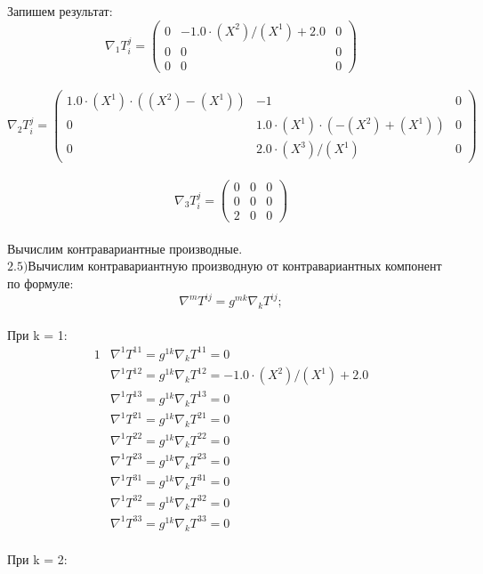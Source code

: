 \documentclass[a4paper, 12pt, oneside]{article}
\begin{document}
Запишем результат:\\
\[
\nabla_1T^j_i = \begin{pmatrix}
	0 & -1.0\cdot (X^2)/(X^1) + 2.0 & 0\\
	0 & 0 & 0\\
	0 & 0 & 0
\end{pmatrix}
\]\\
\[
\nabla_2T^j_i = \begin{pmatrix}
	1.0\cdot (X^1)\cdot ((X^2) - (X^1)) & -1 & 0\\
	0 & 1.0\cdot (X^1)\cdot (-(X^2) + (X^1)) & 0\\
	0 & 2.0\cdot (X^3)/(X^1) & 0
\end{pmatrix}
\]\\
\[
\nabla_3T^j_i = \begin{pmatrix}
	0 & 0 & 0\\
	0 & 0 & 0\\
	2 & 0 & 0
\end{pmatrix}
\]\\
Вычислим контравариантные производные.\\
$\mathrm{2.5) }$Вычислим контравариантную производную от контравариантных компонент по формуле:\\
\[
\nabla^mT^{ij} = g^{mk}\nabla_kT^{ij};
\]\\
При k = 1:\\
\begin{alignat*}{1}
  & \nabla^1T^{11} = g^{1k}\nabla_kT^{11} = 0 \\
  & \nabla^1T^{12} = g^{1k}\nabla_kT^{12} = -1.0\cdot (X^2)/(X^1) + 2.0 \\
  & \nabla^1T^{13} = g^{1k}\nabla_kT^{13} = 0 \\
  & \nabla^1T^{21} = g^{1k}\nabla_kT^{21} = 0 \\
  & \nabla^1T^{22} = g^{1k}\nabla_kT^{22} = 0 \\
  & \nabla^1T^{23} = g^{1k}\nabla_kT^{23} = 0 \\
  & \nabla^1T^{31} = g^{1k}\nabla_kT^{31} = 0 \\
  & \nabla^1T^{32} = g^{1k}\nabla_kT^{32} = 0 \\
  & \nabla^1T^{33} = g^{1k}\nabla_kT^{33} = 0 
\end{alignat*}\\
При k = 2:\\
\end{document}
